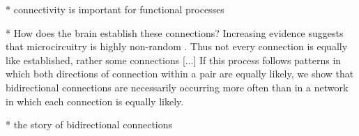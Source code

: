 
* connectivity is important for functional processes

* How does the brain establish these connections? Increasing evidence suggests that microcircuitry is highly non-random \cite{Song2005,Perin2011}. Thus not every connection is equally like established, rather some connections [...] If this process follows patterns in which both directions of connection within a pair are equally likely, we show that bidirectional connections are necessarily occurring more often than in a network in which each connection is equally likely.


* the story of bidirectional connections


